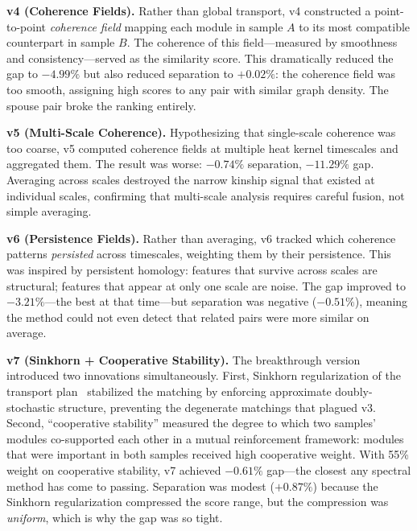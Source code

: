 \documentclass{../yalumba}
\begin{document}
\textbf{v4 (Coherence Fields).}  Rather than global transport, v4
constructed a point-to-point \emph{coherence field} mapping each module
in sample $A$ to its most compatible counterpart in sample $B$.  The
coherence of this field---measured by smoothness and consistency---served
as the similarity score.  This dramatically reduced the gap to $-4.99\%$
but also reduced separation to $+0.02\%$: the coherence field was too
smooth, assigning high scores to any pair with similar graph density.
The spouse pair broke the ranking entirely.

\textbf{v5 (Multi-Scale Coherence).}  Hypothesizing that single-scale
coherence was too coarse, v5 computed coherence fields at multiple
heat kernel timescales and aggregated them.  The result was worse:
$-0.74\%$ separation, $-11.29\%$ gap.  Averaging across scales
destroyed the narrow kinship signal that existed at individual scales,
confirming that multi-scale analysis requires careful fusion, not
simple averaging.

\textbf{v6 (Persistence Fields).}  Rather than averaging, v6 tracked
which coherence patterns \emph{persisted} across timescales, weighting
them by their persistence.  This was inspired by persistent homology:
features that survive across scales are structural; features that appear
at only one scale are noise.  The gap improved to $-3.21\%$---the best
at that time---but separation was negative ($-0.51\%$), meaning the
method could not even detect that related pairs were more similar on
average.


\textbf{v7 (Sinkhorn + Cooperative Stability).}  The breakthrough version
introduced two innovations simultaneously.  First, Sinkhorn regularization
of the transport plan~\cite{cuturi2013sinkhorn} stabilized the matching
by enforcing approximate doubly-stochastic structure, preventing the
degenerate matchings that plagued v3.  Second, ``cooperative stability''
measured the degree to which two samples' modules co-supported each other
in a mutual reinforcement framework: modules that were important in both
samples received high cooperative weight.  With 55\% weight on
cooperative stability, v7 achieved $-0.61\%$ gap---the closest any
spectral method has come to passing.  Separation was modest ($+0.87\%$)
because the Sinkhorn regularization compressed the score range, but the
compression was \emph{uniform}, which is why the gap was so tight.
\end{document}
